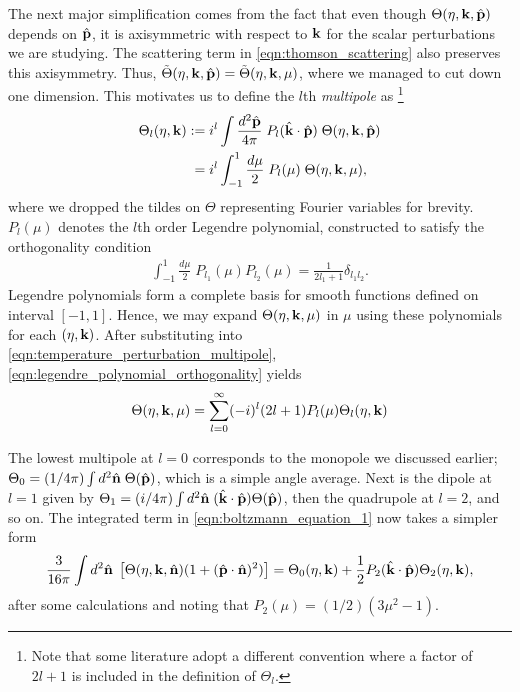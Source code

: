 The next major simplification comes from the fact that even though $\Theta(\eta,\mathbf{k},\hat{\mathbf{p}})$ depends on $\hat{\mathbf{p}}$, it is axisymmetric with respect to $\mathbf{k}$ for the scalar perturbations we are studying. The scattering term in \eqref{eqn:thomson_scattering} also preserves this axisymmetry. Thus, $\tilde{\Theta}(\eta,\mathbf{k},\hat{\mathbf{p}}) = \tilde{\Theta}(\eta,\mathbf{k},\mu)$, where we managed to cut down one dimension. This motivates us to define the $l$th \textit{multipole} as \footnote{Note that some literature adopt a different convention where a factor of $2l+1$ is included in the definition of $\Theta_l$.}
\begin{align}
	\Theta_l (\eta,\mathbf{k}) :=& \; i^l \int \frac{d^2 \hat{\mathbf{p}}}{4\pi} \; P_l (\hat{\mathbf{k}} \cdot \hat{\mathbf{p}}) \; \Theta(\eta, \mathbf{k}, \hat{\mathbf{p}}) \\
	=& \; i^l \int^1_{-1} \frac{d\mu}{2} \; P_l (\mu) \; \Theta(\eta, \mathbf{k}, \mu), \label{eqn:temperature_perturbation_multipole} 
\end{align}
where we dropped the tildes on $\Theta$ representing Fourier variables for brevity. $P_l(\mu)$ denotes the $l$th order Legendre polynomial, constructed to satisfy the orthogonality condition
\begin{align}
	\int_{-1}^{1} \frac{d\mu}{2} \; P_{l_1}(\mu) P_{l_2}(\mu) = \frac{1}{2l_1 + 1} \delta_{l_1 l_2}. \label{eqn:legendre_polynomial_orthogonality}
\end{align}
Legendre polynomials form a complete basis for smooth functions defined on interval $[-1,1]$. Hence, we may expand $\Theta(\eta,\mathbf{k},\mu)$ in $\mu$ using these polynomials for each $(\eta,\mathbf{k})$. After substituting into \eqref{eqn:temperature_perturbation_multipole}, \eqref{eqn:legendre_polynomial_orthogonality} yields
\begin{align}
	\Theta(\eta,\mathbf{k},\mu) = \sum_{l=0}^{\infty} (-i)^l (2l+1) P_l (\mu) \Theta_l (\eta, \mathbf{k}) \label{eqn:temperature_perturbation_legendre_expansion}
\end{align}

The lowest multipole at $l=0$ corresponds to the monopole we discussed earlier; $\Theta_0 = (1/4\pi) \int d^2\hat{\mathbf{n}} \; \Theta(\hat{\mathbf{p}})$, which is a simple angle average. Next is the dipole at $l=1$ given by $\Theta_1 = (i/4\pi) \int d^2\hat{\mathbf{n}} \; (\hat{\mathbf{k}} \cdot \hat{\mathbf{p}}) \Theta(\hat{\mathbf{p}})$, then the quadrupole at $l=2$, and so on. The integrated term in \eqref{eqn:boltzmann_equation_1} now takes a simpler form
\begin{align}
	\frac{3}{16\pi} \int d^2\hat{\mathbf{n}} \; \left[ \Theta(\eta,\mathbf{k},\hat{\mathbf{n}}) (1 + (\hat{\mathbf{p}} \cdot \hat{\mathbf{n}})^2) \right] = \Theta_0 (\eta,\mathbf{k}) + \frac{1}{2} P_2 (\hat{\mathbf{k}} \cdot \hat{\mathbf{p}}) \Theta_2(\eta, \mathbf{k}), 
\end{align}
after some calculations and noting that $P_2(\mu) = (1/2)(3\mu^2 -1)$.

